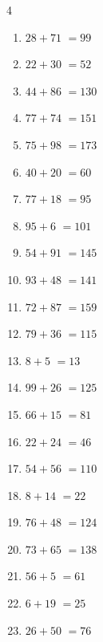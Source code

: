 \begin{multicols}{4}
\begin{enumerate}
  \item $28+71$
        $=99$

  \item $22+30$
        $=52$

  \item $44+86$
        $=130$

  \item $77+74$
        $=151$

  \item $75+98$
        $=173$

  \item $40+20$
        $=60$

  \item $77+18$
        $=95$

  \item $95+6$
        $=101$

  \item $54+91$
        $=145$

  \item $93+48$
        $=141$

\columnbreak %

  \item $72+87$
        $=159$

  \item $79+36$
        $=115$

  \item $8+5$
        $=13$

  \item $99+26$
        $=125$

  \item $66+15$
        $=81$

  \item $22+24$
        $=46$

  \item $54+56$
        $=110$

  \item $8+14$
        $=22$

  \item $76+48$
        $=124$

  \item $73+65$
        $=138$

  \item $56+5$
        $=61$

  \item $6+19$
        $=25$

  \item $26+50$
        $=76$


\end{enumerate}
\end{multicols}
